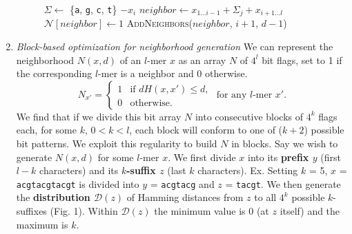 \documentclass{acm_proc_article-sp}
\begin{document}
\begin{enumerate}
\begin{figure}[h]
\begin{algorithmic}[1]
						\State $\Sigma \leftarrow$ \{\texttt{a}, \texttt{g}, \texttt{c}, \texttt{t}\} $- x_{i}$ \hspace*{6pt}
							\State $neighbor \leftarrow x_{1...i-1} + \Sigma_{j} + x_{i+1...l}$
							\State $\mathcal{N}[neighbor] \leftarrow 1$
								\State \textsc{AddNeighbors}($neighbor$, $i+1$, $d-1$)
							\EndIf
						\EndFor
					\EndFor
				\EndProcedure
				\end{algorithmic}
			\end{figure}
		\newpage
		\item{\em Block-based optimization for neighborhood generation}\newline
			We can represent the neighborhood $N(x,d)$ of an $l$-mer $x$ as an array $N$ of $4^{l}$ bit flags, set to 1 if the corresponding $l$-mer is a neighbor and 0 otherwise.
			\begin{equation*}
				N_{x'} = \left\{
				\begin{array}{rl}
					1 & \text{if } dH(x,x') \leq d,\\
					0 & \text{otherwise.}%
				\end{array} \right.
				\text{ for any $l$-mer }x'.
				\end{equation*}
			We find that if we divide this bit array $N$ into consecutive blocks of $4^{k}$ flags each, for some $k$, $0 < k < l$, each block will conform to one of ($k + 2$) possible bit patterns. We exploit this regularity to build $N$ in blocks.\newline\newline
			Say we wish to generate $N(x,d)$ for some $l$-mer $x$. We first divide $x$ into its {\boldmath\bf prefix $y$} (first $l-k$ characters) and its {\boldmath\bf $k$-suffix $z$} (last $k$ characters).\newline\newline	
				{\small 
					Ex. Setting $k$ = 5, $x$ = \texttt{acgtacgtacgt}\newline
					\hspace*{18pt}is divided into $y$ = \texttt{acgtacg} and $z$ = \texttt{tacgt}.}\newline\newline
			We then generate the {\boldmath\bf distribution $\mathcal{D}(z)$} of Hamming distances from $z$ to all $4^{k}$ possible $k$-suffixes (Fig. 1). Within $\mathcal{D}(z)$ the minimum value is 0 (at $z$ itself) and the maximum is $k$.%
			\begin{figure}[h]

\end{figure}
\end{enumerate}
\end{document}
